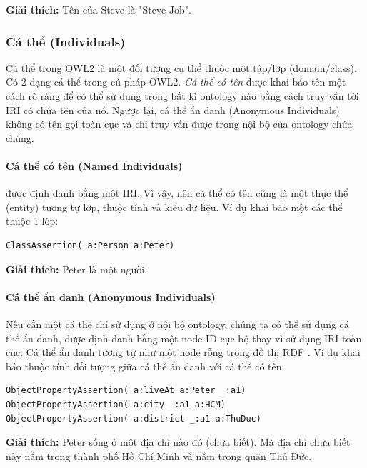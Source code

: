 \textbf{Giải thích:} Tên của Steve là "Steve Job".

\subsubsection{Cá thể (Individuals)}
Cá thể trong OWL2 là một đối tượng cụ thể thuộc một tập/lớp (domain/class). Có 2 dạng cá thể trong cú pháp OWL2. \textit{Cá thể có tên} được khai báo tên một cách rõ ràng để có thể sử dụng trong bất kì ontology nào bằng cách truy vấn tới IRI có chứa tên của nó. Ngược lại, cá thể ẩn danh (Anonymous Individuals) không có tên gọi toàn cục và chỉ truy vấn được trong nội bộ của ontology chứa chúng.

\paragraph{Cá thể có tên (Named Individuals)} được định danh bằng một IRI. Vì vậy, nên cá thể có tên cũng là một thực thể (entity) tương tự lớp, thuộc tính và kiểu dữ liệu. Ví dụ khai báo một các thể thuộc 1 lớp:


\begin{verbatim}
ClassAssertion( a:Person a:Peter)
\end{verbatim}


\textbf{Giải thích:} Peter là một người.

\paragraph{Cá thể ẩn danh (Anonymous Individuals)} Nếu cần một cá thể chỉ sử dụng ở nội bộ ontology, chúng ta có thể sử dụng cá thể ẩn danh, được định danh bằng một node ID cục bộ thay vì sử dụng IRI toàn cục. Cá thể ẩn danh tương tự như một node rỗng trong đồ thị RDF \cite{rdf_concept}. Ví dụ khai báo thuộc tính đối tượng giữa cá thể ẩn danh với cá thể có tên:

\begin{verbatim}
ObjectPropertyAssertion( a:liveAt a:Peter _:a1)
ObjectPropertyAssertion( a:city _:a1 a:HCM)
ObjectPropertyAssertion( a:district _:a1 a:ThuDuc)
\end{verbatim}

\textbf{Giải thích:} Peter sống ở một địa chỉ nào đó (chưa biết). Mà địa chỉ chưa biết này nằm trong thành phố Hồ Chí Minh và nằm trong quận Thủ Đức.

